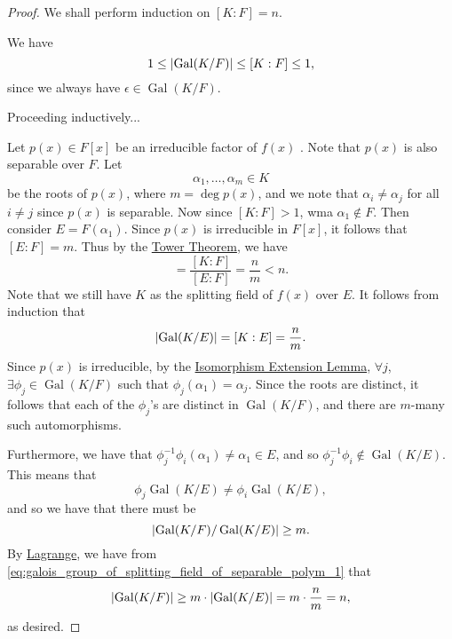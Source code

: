 \documentclass[notoc,notitlepage]{tufte-book}
\DeclareMathOperator{\Gal}{Gal}
\begin{document}
\begin{proof}
  We shall perform induction on $[ K : F ] = n$.

  \noindent
   We have
  \begin{equation*}
    1 \leq \abs{ \Gal(K / F) } \leq [ K : F ] \leq 1,
  \end{equation*}
  since we always have $\epsilon \in \Gal(K / F)$.
  
  Proceeding inductively...
  
  \noindent
   Let $p(x) \in F[x]$ be an irreducible factor of $f(x)$
  . Note that
  $p(x)$ is also separable over $F$. Let
  \begin{equation*}
    \alpha_1, \ldots, \alpha_m \in K
  \end{equation*}
  be the roots of $p(x)$, where $m = \deg p(x)$, and we note that $\alpha_i \neq
  \alpha_j$ for all $i \neq j$ since $p(x)$ is separable. Now since $[ K : F ] >
  1$, wma $\alpha_1 \notin F$. Then consider $E = F(\alpha_1)$. Since $p(x)$ is
  irreducible in $F[x]$, it follows that $[ E : F ] = m$. Thus by the
  \hyperref[thm:tower_theorem]{Tower Theorem}, we have
  \begin{equation*}
    [ K : E ] = \frac{[ K : F ]}{[ E : F ]} = \frac{n}{m} < n.
  \end{equation*}
  Note that we still have $K$ as the splitting field of $f(x)$ over $E$. It
  follows from induction that
  \begin{equation}\label{eq:galois_group_of_splitting_field_of_separable_polym_1}
    \abs{ \Gal( K / E ) } = [ K : E ] = \frac{n}{m}.
  \end{equation}
  Since $p(x)$ is irreducible, by the
  \hyperref[lemma:isomorphism_extension_lemma]{Isomorphism Extension Lemma},
  $\forall j$, $\exists \phi_j \in \Gal(K / F)$ such that $\phi_j(\alpha_1) =
  \alpha_j$. Since the roots are distinct, it follows that each of the
  $\phi_j$'s are distinct in $\Gal (K / F)$, and there are $m$-many such
  automorphisms.

  Furthermore, we have that $\phi_j^{-1} \phi_i (\alpha_1) \neq \alpha_1 \in E$,
  and so $\phi_j^{-1} \phi_i \notin \Gal(K / E)$. This means that
  \begin{equation*}
    \phi_j \Gal(K / E) \neq \phi_i \Gal(K / E),
  \end{equation*}
  and so we have that there must be
  \begin{equation*}
    \abs{ \Gal(K / F) / \Gal(K / E) } \geq m.
  \end{equation*}
  By \hyperref[thm:lagrange_s_theorem]{Lagrange}, we have from
  \cref{eq:galois_group_of_splitting_field_of_separable_polym_1} that
  \begin{equation*}
    \abs{ \Gal(K / F) } \geq m \cdot \abs{ \Gal(K / E) } = m \cdot \frac{n}{m} =
    n,
  \end{equation*}
  as desired.
\end{proof}
\end{document}
